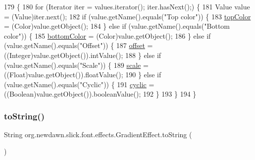\begin{DoxyCode}
179                                        \{
180         \textcolor{keywordflow}{for} (Iterator iter = values.iterator(); iter.hasNext();) \{
181             Value value = (Value)iter.next();
182             \textcolor{keywordflow}{if} (value.getName().equals(\textcolor{stringliteral}{"Top color"})) \{
183                 \mbox{\hyperlink{classorg_1_1newdawn_1_1slick_1_1font_1_1effects_1_1_gradient_effect_abd381669fcbe81fae9c0fb7546d8089d}{topColor}} = (Color)value.getObject();
184             \} \textcolor{keywordflow}{else} \textcolor{keywordflow}{if} (value.getName().equals(\textcolor{stringliteral}{"Bottom color"})) \{
185                 \mbox{\hyperlink{classorg_1_1newdawn_1_1slick_1_1font_1_1effects_1_1_gradient_effect_afc1661928816b8210b1fe9d6f43c74c8}{bottomColor}} = (Color)value.getObject();
186             \} \textcolor{keywordflow}{else} \textcolor{keywordflow}{if} (value.getName().equals(\textcolor{stringliteral}{"Offset"})) \{
187                 \mbox{\hyperlink{classorg_1_1newdawn_1_1slick_1_1font_1_1effects_1_1_gradient_effect_ab518db3e9fe880bf83ce8b37ee361825}{offset}} = ((Integer)value.getObject()).intValue();
188             \} \textcolor{keywordflow}{else} \textcolor{keywordflow}{if} (value.getName().equals(\textcolor{stringliteral}{"Scale"})) \{
189                 \mbox{\hyperlink{classorg_1_1newdawn_1_1slick_1_1font_1_1effects_1_1_gradient_effect_aa2b56ea1a52119215a041ac8328abcec}{scale}} = ((Float)value.getObject()).floatValue();
190             \} \textcolor{keywordflow}{else} \textcolor{keywordflow}{if} (value.getName().equals(\textcolor{stringliteral}{"Cyclic"})) \{
191                 \mbox{\hyperlink{classorg_1_1newdawn_1_1slick_1_1font_1_1effects_1_1_gradient_effect_acbd7560addc0833e17851d5008dfbf18}{cyclic}} = ((Boolean)value.getObject()).booleanValue();
192             \}
193         \}
194     \}
\end{DoxyCode}
\mbox{\label{classorg_1_1newdawn_1_1slick_1_1font_1_1effects_1_1_gradient_effect_a184409c27d256a577d8d26db80c5515b}} 
\subsubsection{\texorpdfstring{to\+String()}{toString()}}
{\footnotesize\ttfamily String org.\+newdawn.\+slick.\+font.\+effects.\+Gradient\+Effect.\+to\+String (\begin{DoxyParamCaption}{ }\end{DoxyParamCaption})\hspace{0.3cm}{\ttfamily [inline]}}

